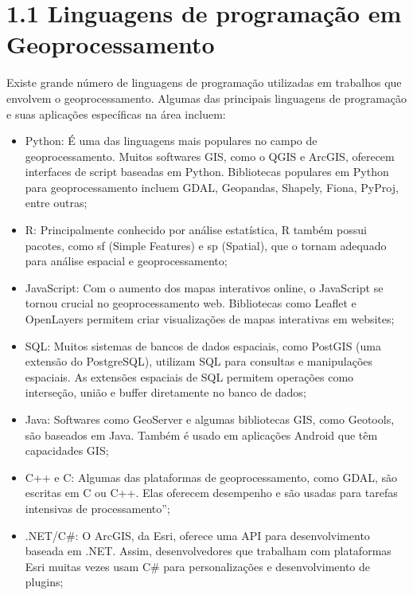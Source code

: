 \documentclass[letterpaper,10pt,english]{jupyterBook}
\begin{document}
\section{1.1 Linguagens de programação em Geoprocessamento}
\label{\detokenize{introducao:linguagens-de-programacao-em-geoprocessamento}}
\sphinxAtStartPar
Existe grande número de linguagens de programação utilizadas em trabalhos que envolvem o geoprocessamento. Algumas das principais linguagens de programação e suas aplicações específicas na área incluem:
\begin{itemize}
\item {} 
\sphinxAtStartPar
Python: É uma das linguagens mais populares no campo de geoprocessamento. Muitos softwares GIS, como o QGIS e ArcGIS, oferecem interfaces de script baseadas em Python. Bibliotecas populares em Python para geoprocessamento incluem GDAL, Geopandas, Shapely, Fiona, PyProj, entre outras;

\item {} 
\sphinxAtStartPar
R: Principalmente conhecido por análise estatística, R também possui pacotes, como sf (Simple Features) e sp (Spatial), que o tornam adequado para análise espacial e geoprocessamento;

\item {} 
\sphinxAtStartPar
JavaScript: Com o aumento dos mapas interativos online, o JavaScript se tornou crucial no geoprocessamento web. Bibliotecas como Leaflet e OpenLayers permitem criar visualizações de mapas interativas em websites;

\item {} 
\sphinxAtStartPar
SQL: Muitos sistemas de bancos de dados espaciais, como PostGIS (uma extensão do PostgreSQL), utilizam SQL para consultas e manipulações espaciais. As extensões espaciais de SQL permitem operações como interseção, união e buffer diretamente no banco de dados;

\item {} 
\sphinxAtStartPar
Java: Softwares como GeoServer e algumas bibliotecas GIS, como Geotools, são baseados em Java. Também é usado em aplicações Android que têm capacidades GIS;

\item {} 
\sphinxAtStartPar
C++ e C: Algumas das plataformas de geoprocessamento, como GDAL, são escritas em C ou C++. Elas oferecem desempenho e são usadas para tarefas intensivas de processamento”;

\item {} 
\sphinxAtStartPar
.NET/C\#: O ArcGIS, da Esri, oferece uma API para desenvolvimento baseada em .NET. Assim, desenvolvedores que trabalham com plataformas Esri muitas vezes usam C\# para personalizações e desenvolvimento de plugins;

\end{itemize}
\end{document}
